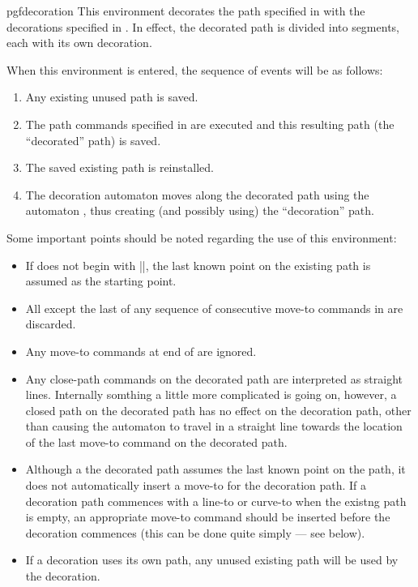 \begin{environment}{{pgfdecoration}}
	This environment decorates the path specified in 
	 with the 
	decorations specified in . In effect, the
	decorated path is divided into segments, each with its own 
	decoration.
	
	When this environment is entered, the sequence of 
	events will be as follows:
		\begin{enumerate}
			\item
				Any existing unused path is saved.
			\item 
				The path commands specified in  are
				executed and this resulting path (the ``decorated'' path) is 
				saved. 
			\item
				The saved existing path is reinstalled.
			\item
				The decoration automaton moves along the decorated path using
				the automaton , thus creating (and
				possibly using) the ``decoration'' path.
		\end{enumerate}
	 
	Some important points should be noted regarding the use of this
	environment:
	
	\begin{itemize}
		\item
			If  does not begin with 
			|\pgfpathmoveto|,	the last known point on the existing path is 
			assumed as the starting point.
		\item
			All except the last of any sequence of consecutive move-to commands 
			in  are discarded.
		\item
			Any move-to commands at end of  are 
			ignored.
		\item
			Any close-path commands on the decorated path are interpreted as 
			straight lines.
			Internally somthing a little more complicated is going on,
			however, a closed path on the decorated path has no effect on the 
			decoration path, other than causing the automaton to travel in a 
			straight line towards the location of the last move-to command on 
			the decorated path.
		\item
			Although a the decorated path assumes the last known point on the
			path, it does not automatically insert a move-to for the decoration
			path. 
			If a decoration	path commences with a line-to or curve-to when the 
			existng path is empty, an appropriate move-to command should be 
			inserted before the decoration commences (this can be done quite
			simply --- see below).
		\item
			If a decoration uses its own path, any unused existing path will
			be used by the decoration. 
	\end{itemize}
	

\end{environment}
